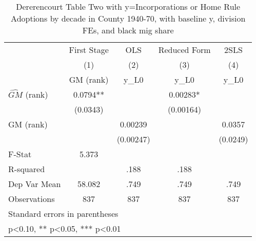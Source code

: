\begin{table}[htbp]\centering
\def\sym#1{\ifmmode^{#1}\else\(^{#1}\)\fi}
\caption{Dererencourt Table Two with y=Incorporations or Home Rule Adoptions by decade in County 1940-70, with baseline y, division FEs, and black mig share}
\begin{tabular}{l*{4}{c}}
\toprule
                    & First Stage   &         OLS   &Reduced Form   &        2SLS   \\
                    &\multicolumn{1}{c}{(1)}&\multicolumn{1}{c}{(2)}&\multicolumn{1}{c}{(3)}&\multicolumn{1}{c}{(4)}\\
                    &\multicolumn{1}{c}{GM  (rank)}&\multicolumn{1}{c}{y\_L0}&\multicolumn{1}{c}{y\_L0}&\multicolumn{1}{c}{y\_L0}\\
\midrule
$\hat{GM}$ (rank)   &      0.0794** &               &     0.00283*  &               \\
                    &    (0.0343)   &               &   (0.00164)   &               \\
\addlinespace
GM  (rank)          &               &     0.00239   &               &      0.0357   \\
                    &               &   (0.00247)   &               &    (0.0249)   \\
\midrule
F-Stat              &       5.373   &               &               &               \\
R-squared           &               &        .188   &        .188   &               \\
Dep Var Mean        &      58.082   &        .749   &        .749   &        .749   \\
Observations        &         837   &         837   &         837   &         837   \\
\bottomrule
\multicolumn{5}{l}{\footnotesize Standard errors in parentheses}\\
\multicolumn{5}{l}{\footnotesize * p<0.10, ** p<0.05, *** p<0.01}\\
\end{tabular}
\end{table}
